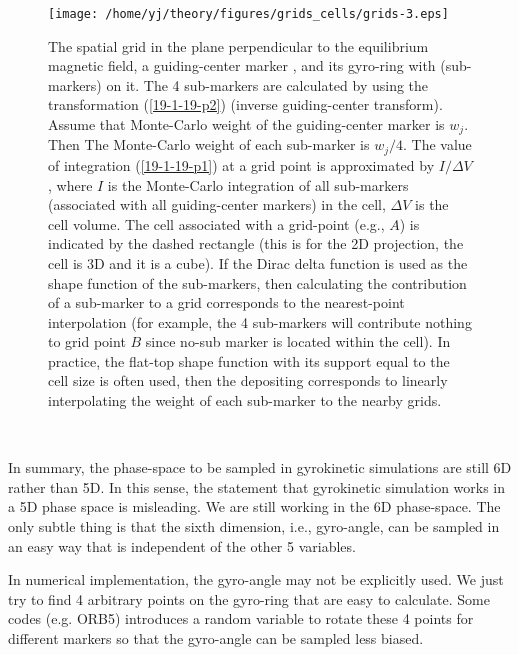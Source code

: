 \documentclass{llncs}
\newcommand{\tmcolor}[2]{{\color{#1}{#2}}}
\begin{document}
\begin{figure}[h]
  \texttt{[image: /home/yj/theory/figures/grids\_cells/grids-3.eps]}
  \caption{\label{19-1-19-p4}The spatial grid in the plane perpendicular to
  the equilibrium magnetic field, a guiding-center marker \tmcolor{red}{$C$},
  and its gyro-ring with \tmcolor{blue}{4 sampling points} (sub-markers) on
  it. The 4 sub-markers are calculated by using the transformation
  (\ref{19-1-19-p2}) (inverse guiding-center transform). Assume that
  Monte-Carlo weight of the guiding-center marker \tmcolor{red}{$C$} is $w_j$.
  Then The Monte-Carlo weight of each sub-marker is $w_j / 4$. The value of
  integration (\ref{19-1-19-p1}) at a grid point is approximated by $I /
  \Delta V$, where $I$ is the Monte-Carlo integration of all sub-markers
  (associated with all guiding-center markers) in the cell, $\Delta V$ is the
  cell volume. The cell associated with a grid-point (e.g., $A$) is indicated
  by the dashed rectangle (this is for the 2D projection, the cell is 3D and
  it is a cube). If the Dirac delta function is used as the shape function of
  the sub-markers, then calculating the contribution of a sub-marker to a grid
  corresponds to the nearest-point interpolation (for example, the 4
  sub-markers will contribute nothing to grid point $B$ since no-sub marker is
  located within the cell). In practice, the flat-top shape function with its
  support equal to the cell size is often used, then the depositing
  corresponds to linearly interpolating the weight of each sub-marker to the
  nearby grids.}
\end{figure}

\

In summary, the phase-space to be sampled in gyrokinetic simulations are
still 6D rather than 5D. In this sense, the statement that gyrokinetic
simulation works in a 5D phase space is misleading. We are still working in
the 6D phase-space. The only subtle thing is that the sixth dimension, i.e.,
gyro-angle, can be sampled in an easy way that is independent of the other 5
variables.

In numerical implementation, the gyro-angle may not be explicitly used. We
just try to find 4 arbitrary points on the gyro-ring that are easy to
calculate. Some codes (e.g. ORB5) introduces a random variable to rotate these
4 points for different markers so that the gyro-angle can be sampled less
biased.
\end{document}
